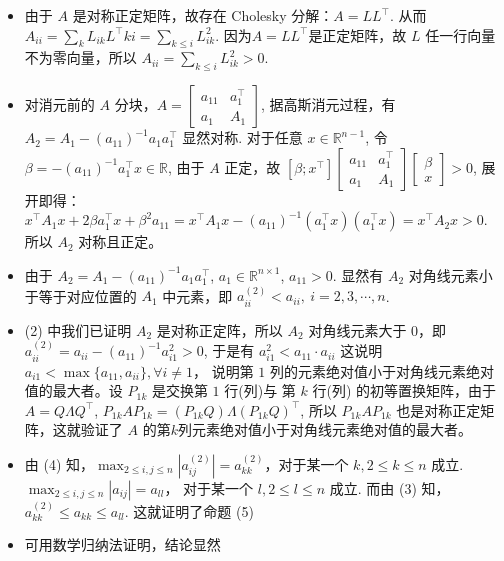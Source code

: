 \documentclass{article}
\begin{document}
\begin{itemize}
\begin{spacing}{1.5}
    \begin{itemize}
        \item [(1)] 由于 $A$ 是对称正定矩阵，故存在 Cholesky 分解：$A = LL^\top$. 从而 $A_{ii} = \sum_{k} L_{ik}L^\top{ki} = \sum_{k\leq i} L_{ik}^2$. 因为$A = LL^\top$是正定矩阵，故 $L$ 任一行向量不为零向量，所以 $A_{ii} = \sum_{k\leq i} L_{ik}^2 > 0$.
        \item [(2)] 对消元前的 $A$ 分块，$A = \left[\begin{array}{cc}a_{11} & a_1^\top \\ a_1 & A_1\end{array}\right]$, 据高斯消元过程，有 $A_2 = A_1 - (a_{11})^{-1}a_1a_1^\top$ 显然对称. 对于任意 $x\in\mathbb{R}^{n-1}$, 令 $\beta = -(a_{11})^{-1}a_1^\top x\in\mathbb{R}$, 由于 $A$ 正定，故 $[\beta; x^\top] \left[\begin{array}{cc}a_{11}&a_1^\top\\a_1&A_1\end{array}\right]\left[\begin{array}{c}\beta\\x\end{array}\right] > 0$, 展开即得：$x^\top A_1 x + 2\beta a_1^\top x + \beta^2 a_{11} = x^\top A_1 x - (a_{11})^{-1}(a_1^\top x)(a_1^\top x) = x^\top A_2 x > 0$. 所以 $A_2$ 对称且正定。
        \item [(3)] 由于 $A_2 = A_1 - (a_{11})^{-1}a_1a_1^\top$, $a_1\in\mathbb{R}^{n\times 1}$, $a_{11} > 0$. 显然有 $A_2$ 对角线元素小于等于对应位置的 $A_1$ 中元素，即 $a_{ii}^{(2)} < a_{ii},\ i=2,3,\cdots, n$.
        \item [(4)] (2) 中我们已证明 $A_2$ 是对称正定阵，所以 $A_2$ 对角线元素大于 $0$，即 $ a_{ii}^{(2)} = a_{ii} - (a_{11})^{-1}a^2_{i1} > 0$, 于是有 $a_{i1}^2 < a_{11}\cdot a_{ii}$ 这说明 $a_{i1} < \max\{a_{11}, a_{ii}\}, \forall i \ne 1$， 说明第 $1$ 列的元素绝对值小于对角线元素绝对值的最大者。设 $P_{1k}$ 是交换第 $1$ 行(列)与 第 $k$ 行(列) 的初等置换矩阵，由于$A = Q\Lambda Q^\top$, $P_{1k}AP_{1k} = (P_{1k}Q)\Lambda(P_{1k}Q)^\top$, 所以 $P_{1k}AP_{1k}$ 也是对称正定矩阵，这就验证了 $A$ 的第$k$列元素绝对值小于对角线元素绝对值的最大者。
        \item [(5)] 由 (4) 知，$\max _{2\leq i, j\leq n} |a_{ij}^{(2)}| = a^{(2)}_{kk}$，对于某一个 $k, 2\leq k\leq n$ 成立. $\max_{2\leq i, j\leq n} |a_{ij}| = a_{ll}$， 对于某一个 $l, 2\leq l\leq n$ 成立. 而由 (3) 知，$a_{kk}^{(2)} \leq a_{kk} \leq a_{ll}$. 这就证明了命题 (5)
        \item [(6)] 可用数学归纳法证明，结论显然
    \end{itemize}
        

\end{spacing}
\end{itemize}
\end{document}
